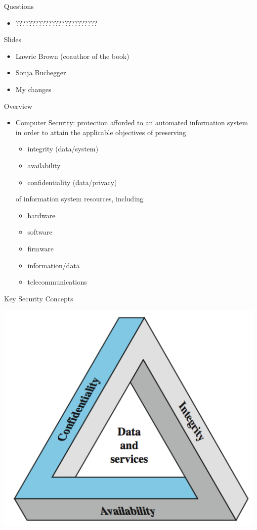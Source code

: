 \documentclass{beamer}
\begin{document}
\begin{frame}{Questions}
  \begin{itemize}
  \item ?????????????????????????
  \end{itemize}
\end{frame}

\begin{frame}{Slides}
  \begin{itemize}
  \item Lawrie Brown (coauthor of the book)
  \item Sonja Buchegger
  \item My changes
  \end{itemize}
\end{frame}

\begin{frame}{Overview}
  \begin{itemize}
  \item \alert{Computer Security}: protection afforded to an 
    automated information system in order to attain 
    the applicable objectives of preserving
    
    \begin{itemize}
    \item integrity (data/system)
    \item availability
    \item confidentiality (data/privacy)
    \end{itemize}
of  information system resources, including
 
\begin{itemize}
  \item hardware
  \item software
  \item firmware
  \item information/data
  \item telecommunications
\end{itemize}
  \end{itemize}
\end{frame}


\begin{frame}{Key Security Concepts}
  \begin{center}
    \includegraphics[width=0.7\linewidth]{concepts}
  \end{center}
\end{frame}
\end{document}
